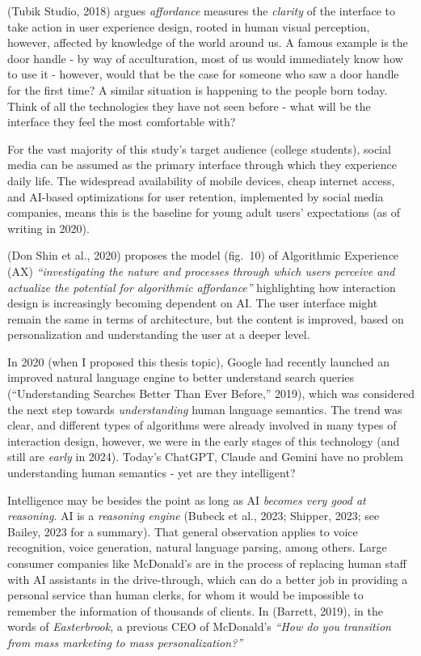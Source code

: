 \documentclass[
  letterpaper,
  DIV=11,
  numbers=noendperiod]{scrartcl}
\begin{document}
(Tubik Studio, 2018) argues \emph{affordance} measures the
\emph{clarity} of the interface to take action in user experience
design, rooted in human visual perception, however, affected by
knowledge of the world around us. A famous example is the door handle -
by way of acculturation, most of us would immediately know how to use it
- however, would that be the case for someone who saw a door handle for
the first time? A similar situation is happening to the people born
today. Think of all the technologies they have not seen before - what
will be the interface they feel the most comfortable with?

For the vast majority of this study's target audience (college
students), social media can be assumed as the primary interface through
which they experience daily life. The widespread availability of mobile
devices, cheap internet access, and AI-based optimizations for user
retention, implemented by social media companies, means this is the
baseline for young adult users' expectations (as of writing in 2020).

(Don Shin et al., 2020) proposes the model (fig.~10) of Algorithmic
Experience (AX) \emph{``investigating the nature and processes through
which users perceive and actualize the potential for algorithmic
affordance''} highlighting how interaction design is increasingly
becoming dependent on AI. The user interface might remain the same in
terms of architecture, but the content is improved, based on
personalization and understanding the user at a deeper level.

In 2020 (when I proposed this thesis topic), Google had recently
launched an improved natural language engine to better understand search
queries ({``Understanding Searches Better Than Ever Before,''} 2019),
which was considered the next step towards \emph{understanding} human
language semantics. The trend was clear, and different types of
algorithms were already involved in many types of interaction design,
however, we were in the early stages of this technology (and still are
\emph{early} in 2024). Today's ChatGPT, Claude and Gemini have no
problem understanding human semantics - yet are they intelligent?

Intelligence may be besides the point as long as AI \emph{becomes very
good at reasoning}. AI is a \emph{reasoning engine} (Bubeck et al.,
2023; Shipper, 2023; see Bailey, 2023 for a summary). That general
observation applies to voice recognition, voice generation, natural
language parsing, among others. Large consumer companies like McDonald's
are in the process of replacing human staff with AI assistants in the
drive-through, which can do a better job in providing a personal service
than human clerks, for whom it would be impossible to remember the
information of thousands of clients. In (Barrett, 2019), in the words of
\emph{Easterbrook}, a previous CEO of McDonald's \emph{``How do you
transition from mass marketing to mass personalization?''}
\end{document}
